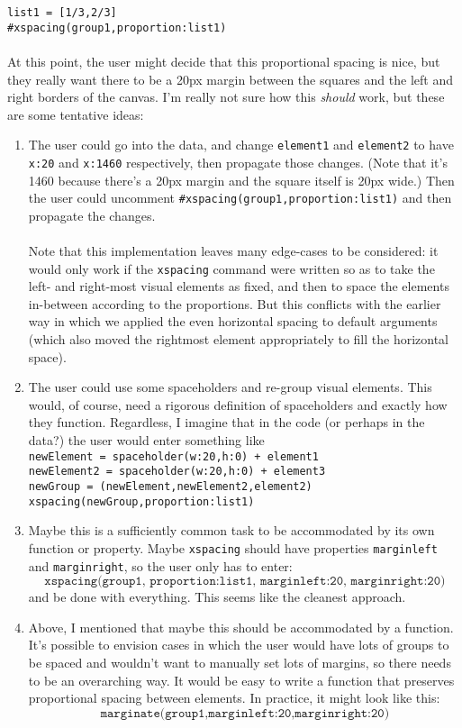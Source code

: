 \documentclass[12pt]{article}
\theoremstyle{remark}
\newcommand{\ttt}[1]{\texttt{#1}}
\begin{document}
\begin{section}
\ttt{list1 = [1/3,2/3]}\\
\ttt{\#xspacing(group1,proportion:list1)}
\\\\
At this point, the user might decide that this proportional spacing is nice, but they really want there to be a 20px margin between the squares and the left and right borders of the canvas. I'm really not sure how this \textit{should} work, but these are some tentative ideas:
\begin{enumerate}
\item The user could go into the data, and change \ttt{element1} and \ttt{element2} to have \ttt{x:20} and \ttt{x:1460} respectively, then propagate those changes. (Note that it's 1460 because there's a 20px margin and the square itself is 20px wide.) Then the user could uncomment \ttt{\#xspacing(group1,proportion:list1)} and then propagate the changes.
\\\\
Note that this implementation leaves many edge-cases to be considered: it would only work if the \ttt{xspacing} command were written so as to take the left- and right-most visual elements as fixed, and then to space the elements in-between according to the proportions. But this conflicts with the earlier way in which we applied the even horizontal spacing to default arguments (which also moved the rightmost element appropriately to fill the horizontal space).
\item The user could use some spaceholders and re-group visual elements. This would, of course, need a rigorous definition of spaceholders and exactly how they function. Regardless, I imagine that in the code (or perhaps in the data?) the user would enter something like
\\\ttt{newElement = spaceholder(w:20,h:0) + element1}\\
\ttt{newElement2 = spaceholder(w:20,h:0) + element3}\\
\ttt{newGroup = (newElement,newElement2,element2)}\\
\ttt{xspacing(newGroup,proportion:list1)}
\newpage 
\item Maybe this is a sufficiently common task to be accommodated by its own function or property. Maybe \ttt{xspacing} should have  properties \ttt{marginleft} and \ttt{marginright}, so the user only has to enter: $$\ttt{xspacing(group1, proportion:list1, marginleft:20, marginright:20)}$$
 and be done with everything. This seems like the cleanest approach.
\item Above, I mentioned that maybe this should be accommodated by a function. It's possible to envision cases in which the user would have lots of groups to be spaced and wouldn't want to manually set lots of margins, so there needs to be an overarching way. It would be easy to write a function that preserves proportional spacing between elements. In practice, it might look like this:
$$\ttt{marginate(group1,marginleft:20,marginright:20)}$$
\end{enumerate}
\end{section} 
\end{document}
